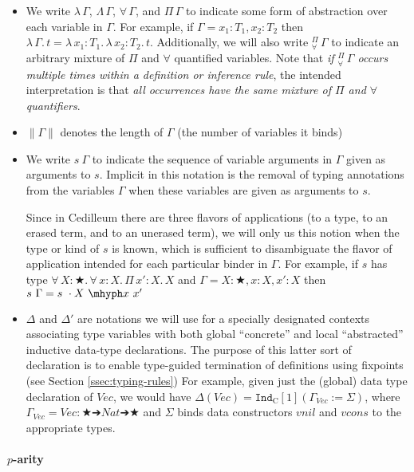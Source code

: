 \documentclass{article}
\newcommand{\ann}[2]{#1\! : \! #2}
\newcommand{\abs}[4]{{#1}\, #2\! : \! #3.\, #4}
\newcommand{\absu}[3]{{#1}\, #2.\, #3}
\newcommand{\indast}[4]{\texttt{Ind}_{#1} [#2] (#3 := #4)}
\newcommand{\lenc}[1]{\|#1\|}
\newcommand{\piforall}{^{\Pi}_{\forall}}
\begin{document}
\begin{itemize}
\item We write $\lambda\,\Gamma$, $\Lambda\,\Gamma$, $\forall\,\Gamma$, and
  $\Pi\,\Gamma$ to indicate some form of abstraction over each variable in
  $\Gamma$. For example, if $\Gamma = \ann{x_1}{T_1},\ann{x_2}{T_2}$ then
  $\absu{\lambda}{\Gamma}{t} =
  \abs{\lambda}{x_1}{T_1}{\abs{\lambda}{x_2}{T_2}{t}}$. Additionally, we
  will also write $\piforall\,\Gamma$ to indicate an arbitrary mixture of $\Pi$
  and $\forall$ quantified variables. Note that \textit{if $\piforall\,\Gamma$
  occurs multiple times within a definition or inference rule}, the intended
  interpretation is that \textit{all occurrences have the same mixture of $\Pi$
    and $\forall$ quantifiers}.
\item $\lenc{\Gamma}$ denotes the length of $\Gamma$ (the number of variables it
  binds)
\item We write $s\ \Gamma$ to indicate the sequence of variable arguments in
  $\Gamma$ given as arguments to $s$. Implicit in this notation is the removal
  of typing annotations from the variables $\Gamma$ when these variables are
  given as arguments to $s$.

  Since in Cedilleum there are three flavors of applications (to a type, to an
  erased term, and to an unerased term), we will only us this notion when the type
  or kind of $s$ is known, which is sufficient to disambiguate the flavor of
  application intended for each particular binder in $\Gamma$. For example,
  if $s$ has type
  $\abs{\forall}{X}{★}{\abs{\forall}{x}{X}{\abs{\Pi}{x'}{X}{X}}}$ and $\Gamma =
  \ann{X}{★},\ann{x}{X},\ann{x'}{X}$ then $s\ \Gamma = s\ \cdot X\ \mhyph x\ x'$
\item $\Delta$ and $\Delta'$ are notations we will use
  for a specially designated contexts associating type variables with both global
  ``concrete'' and local ``abstracted'' inductive data-type declarations.
  The purpose of this latter sort of declaration is to enable type-guided
  termination of definitions using fixpoints (see Section \ref{ssec:typing-rules}) For example, given
  just the (global) data type declaration of $Vec$, we would have $\Delta(Vec) =
  \indast{\text{C}}{1}{\Gamma_{Vec}}{\Sigma}$, where $\Gamma_{Vec} = \ann{Vec}{★ ➔ Nat ➔
    ★}$ and  $\Sigma$ binds data constructors $vnil$ and $vcons$ to the
  appropriate types.
\end{itemize}

\paragraph{$p$-arity}
\end{document}

